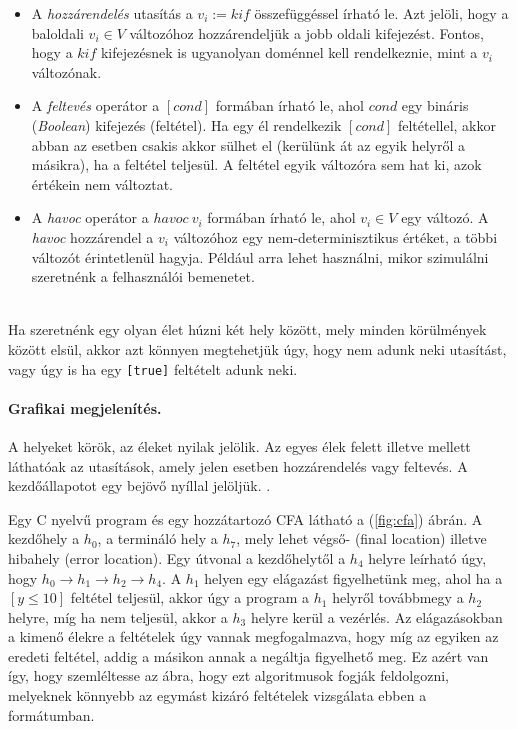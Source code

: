 \begin{itemize}
	\item A \emph{hozzárendelés} utasítás a $v_i := \mathit{kif}$ összefüggéssel írható le. Azt jelöli, hogy a baloldali $v_i \in V$ változóhoz hozzárendeljük a jobb oldali kifejezést. Fontos, hogy a $\mathit{kif}$ kifejezésnek is ugyanolyan doménnel kell rendelkeznie, mint a $v_i$ változónak.
	
	\item A \emph{feltevés} operátor a $[\mathit{cond}]$ formában írható le, ahol $\mathit{cond}$ egy bináris (\emph{Boolean}) kifejezés (feltétel). Ha egy él rendelkezik $\mathit{[cond]}$ feltétellel, akkor abban az esetben csakis akkor sülhet el (kerülünk át az egyik helyről a másikra), ha a feltétel teljesül. A feltétel egyik változóra sem hat ki, azok értékein nem változtat.
	
	\item A \emph{havoc} operátor a $\mathit{havoc}~v_i$ formában írható le, ahol $v_i \in V$ egy változó. A \emph{havoc} hozzárendel a $v_i$ változóhoz egy nem-determinisztikus értéket, a többi változót érintetlenül hagyja. Például arra lehet használni, mikor szimulálni szeretnénk a felhasználói bemenetet.
\end{itemize}
\ \\
Ha szeretnénk egy olyan élet húzni két hely között, mely minden körülmények között elsül, akkor azt könnyen megtehetjük úgy, hogy nem adunk neki utasítást, vagy úgy is ha egy \texttt{[true]} feltételt adunk neki.

\paragraph{Grafikai megjelenítés.}
A helyeket körök, az éleket nyilak jelölik. Az egyes élek felett illetve mellett láthatóak az utasítások, amely jelen esetben hozzárendelés vagy feltevés. A kezdőállapotot egy bejövő nyíllal jelöljük. \cite{soft_ver_akos}.
\ \\
\begin{example}
	Egy C nyelvű program és egy hozzátartozó CFA látható a (\ref{fig:cfa}) ábrán. A kezdőhely a $h_0$, a termináló hely a $h_7$, mely lehet végső- (final location) illetve hibahely (error location). Egy útvonal a kezdőhelytől a $h_4$ helyre leírható úgy, hogy $h_0 \rightarrow h_1 \rightarrow h_2 \rightarrow h_4$. A $h_1$ helyen egy elágazást figyelhetünk meg, ahol ha a $[y \leq 10]$ feltétel teljesül, akkor úgy a program a $h_1$ helyről továbbmegy a $h_2$ helyre, míg ha nem teljesül, akkor a $h_3$ helyre kerül a vezérlés. Az elágazásokban a kimenő élekre a feltételek úgy vannak megfogalmazva, hogy míg az egyiken az eredeti feltétel, addig a másikon annak a negáltja figyelhető meg. Ez azért van így, hogy szemléltesse az ábra, hogy ezt algoritmusok fogják feldolgozni, melyeknek könnyebb az egymást kizáró feltételek vizsgálata ebben a formátumban.
\end{example}

